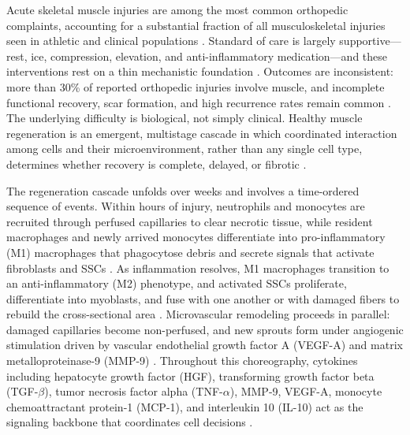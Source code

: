 \documentclass[10pt,letterpaper]{article}
\begin{document}
Acute skeletal muscle injuries are among the most common orthopedic complaints, accounting for a substantial fraction of all musculoskeletal injuries seen in athletic and clinical populations \cite{maffulli2014muscle}. Standard of care is largely supportive---rest, ice, compression, elevation, and anti-inflammatory medication---and these interventions rest on a thin mechanistic foundation \cite{deyhle2018role}. Outcomes are inconsistent: more than 30\% of reported orthopedic injuries involve muscle, and incomplete functional recovery, scar formation, and high recurrence rates remain common \cite{maffulli2014muscle}. The underlying difficulty is biological, not simply clinical. Healthy muscle regeneration is an emergent, multistage cascade in which coordinated interaction among cells and their microenvironment, rather than any single cell type, determines whether recovery is complete, delayed, or fibrotic \cite{forcina2020mechanisms,chazaud2020inflammation}.

The regeneration cascade unfolds over weeks and involves a time-ordered sequence of events. Within hours of injury, neutrophils and monocytes are recruited through perfused capillaries to clear necrotic tissue, while resident macrophages and newly arrived monocytes differentiate into pro-inflammatory (M1) macrophages that phagocytose debris and secrete signals that activate fibroblasts and SSCs \cite{tidball2017regulation,dumont2015satellite}. As inflammation resolves, M1 macrophages transition to an anti-inflammatory (M2) phenotype, and activated SSCs proliferate, differentiate into myoblasts, and fuse with one another or with damaged fibers to rebuild the cross-sectional area \cite{arnold2007inflammatory,bentzinger2013cellular}. Microvascular remodeling proceeds in parallel: damaged capillaries become non-perfused, and new sprouts form under angiogenic stimulation driven by vascular endothelial growth factor A (VEGF-A) and matrix metalloproteinase-9 (MMP-9) \cite{carmeliet2003angiogenesis}. Throughout this choreography, cytokines including hepatocyte growth factor (HGF), transforming growth factor beta (TGF-$\beta$), tumor necrosis factor alpha (TNF-$\alpha$), MMP-9, VEGF-A, monocyte chemoattractant protein-1 (MCP-1), and interleukin 10 (IL-10) act as the signaling backbone that coordinates cell decisions \cite{tatsumi1998hgf,lu2011macrophages}.
\end{document}
